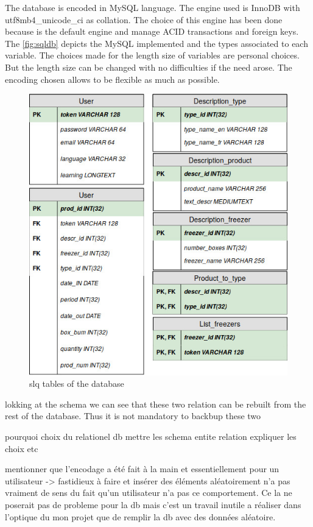 The database is encoded in MySQL language. The engine used is InnoDB with utf8mb4\_unicode\_ci as collation. The choice of this engine has been done because is the default engine and manage ACID transactions and foreign keys. The \autoref{fig:sqldb} depicts the MySQL implemented and the types associated to each variable. The choices made for the length size of variables are personal choices. But the length size can be changed with no difficulties if the need arose. The encoding chosen allows to be flexible as much as possible.

\begin{figure}[H]
\centering
\includegraphics[scale=0.5]{./images/sqldb.jpg}
\caption{slq tables of the database}
\label{fig:sqldb}
\end{figure}


lokking at the schema we can see that these two relation can be rebuilt from the rest of the database. Thus it is not mandatory to backbup these two

pourquoi choix du relationel db
mettre les schema entite relation expliquer les choix etc

 mentionner que l'encodage a été fait à la main et essentiellement pour un utilisateur -> fastidieux à faire et insérer des éléments aléatoirement n'a pas vraiment de sens du fait qu'un utilisateur n'a pas ce comportement. Ce la ne poserait pas de probleme pour la db mais c'est un travail inutile a réaliser dans l'optique du mon projet que de remplir la db avec des données aléatoire.
